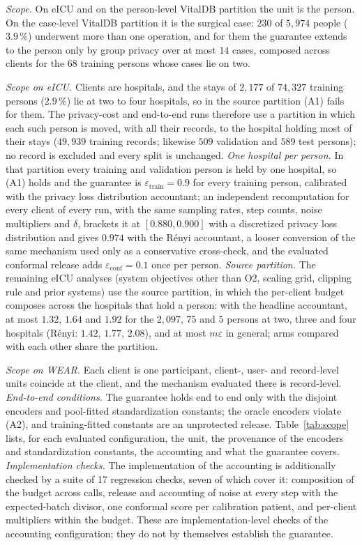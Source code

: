 \emph{Scope.} On eICU and on the person-level VitalDB partition the unit is
the person. On the case-level VitalDB partition it is the surgical case:
$230$ of $5{,}974$ people ($3.9\,\%$) underwent more than one operation, and
for them the guarantee extends to the person only by group privacy over at
most $14$ cases, composed across clients for the $68$ training persons whose
cases lie on two.

\emph{Scope on eICU.} Clients are hospitals, and the stays of $2{,}177$ of $74{,}327$ training persons ($2.9\,\%$) lie at two to four hospitals, so in the source partition (A1) fails for them. The privacy-cost and end-to-end runs therefore use a partition in which each such person is moved, with all their records, to the hospital holding most of their stays ($49{,}939$ training records; likewise $509$ validation and $589$ test persons); no record is excluded and every split is unchanged. \emph{One hospital per person.} In that partition every training and validation person is held by one hospital, so (A1) holds and the guarantee is $\varepsilon_{\mathrm{train}} = 0.9$ for every training person, calibrated with the privacy loss distribution accountant; an independent recomputation for every client of every run, with the same sampling rates, step counts, noise multipliers and $\delta$, brackets it at $[0.880, 0.900]$ with a discretized privacy loss distribution and gives $0.974$ with the R\'enyi accountant, a looser conversion of the same mechanism used only as a conservative cross-check, and the evaluated conformal release adds $\varepsilon_{\mathrm{conf}} = 0.1$ once per person. \emph{Source partition.} The remaining eICU analyses (system objectives other than O2, scaling grid, clipping rule and prior systems) use the source partition, in which the per-client budget composes across the hospitals that hold a person: with the headline accountant, at most $1.32$, $1.64$ and $1.92$ for the $2{,}097$, $75$ and $5$ persons at two, three and four hospitals (R\'enyi: $1.42$, $1.77$, $2.08$), and at most $m\varepsilon$ in general; arms compared with each other share the partition.

\emph{Scope on WEAR.} Each client is one participant, client-, user- and
record-level units coincide at the client, and the mechanism evaluated there
is record-level. \emph{End-to-end conditions.} The guarantee holds end to end only with the disjoint
encoders and pool-fitted standardization constants; the oracle encoders
violate (A2), and training-fitted constants are an unprotected release. Table~\ref{tab:scope} lists, for each evaluated configuration, the unit,
the provenance of the encoders and standardization constants, the accounting
and what the guarantee covers. \emph{Implementation checks.} The implementation of the accounting is
additionally checked by a suite of 17 regression checks, seven of which cover
it: composition of the budget across calls, release and accounting of noise at
every step with the expected-batch divisor, one conformal score per calibration
patient, and per-client multipliers within the budget. These are
implementation-level checks of the accounting configuration; they do not by
themselves establish the guarantee.


